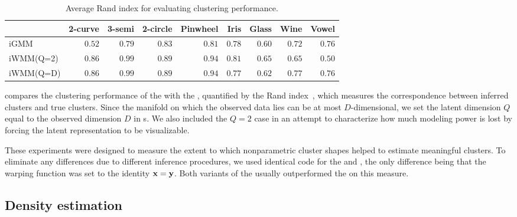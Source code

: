 \begin{table}[ht!]
\centering
\caption[Clustering performance comparison]
{Average Rand index for evaluating clustering performance.}
\label{tab:rand}
\begin{tabular}{lrrrrrrrr}
\hline
 & 2-curve & 3-semi & 2-circle & Pinwheel & Iris  & Glass  & Wine  & Vowel  \\
\hline
iGMM & $0.52$ & $0.79$ & $0.83$ & $0.81$ & $0.78$ & $0.60$ & $0.72$ & $\mathbf{0.76}$ \\
iWMM(Q=2) & $\mathbf{0.86}$ & $\mathbf{0.99}$ & $\mathbf{0.89}$ & $\mathbf{0.94}$ & $\mathbf{0.81}$ & $\mathbf{0.65}$ & $0.65$ & $0.50$ \\
iWMM(Q=D) & $\mathbf{0.86}$ & $\mathbf{0.99}$ & $\mathbf{0.89}$ & $\mathbf{0.94}$ & $0.77$ & $0.62$ & $\mathbf{0.77}$ & $\mathbf{0.76}$ \\
\hline
\end{tabular}
\end{table}
%
 compares the clustering performance of the \iwmm{} with the \iGMM{}, quantified by the Rand index~\citep{rand1971objective}, which measures the correspondence between inferred clusters and true clusters.
Since the manifold on which the observed data lies can be at most $D$-dimensional, we set the latent dimension $Q$ equal to the observed dimension $D$ in \iwmm{}s.
We also included the $Q = 2$ case in an attempt to characterize how much modeling power is lost by forcing the latent representation to be visualizable. 

These experiments were designed to measure the extent to which nonparametric cluster shapes helped to estimate meaningful clusters.
To eliminate any differences due to different inference procedures, we used identical code for the \iGMM{} and \iwmm{}, the only difference being that the warping function was set to the identity ${\bf{x}} = {\bf{y}}$.
Both variants of the \iwmm{} usually outperformed the \iGMM{} on this measure.


\subsection{Density estimation}

